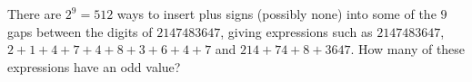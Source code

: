 There are $2^9=512$ ways to insert plus signs (possibly none) into some of the $9$ gaps between the digits of $2147483647$, giving expressions such as $2147483647$, $2+1+4+7+4+8+3+6+4+7$ and $214+74+8+3647$. How many of these expressions have an odd value?
